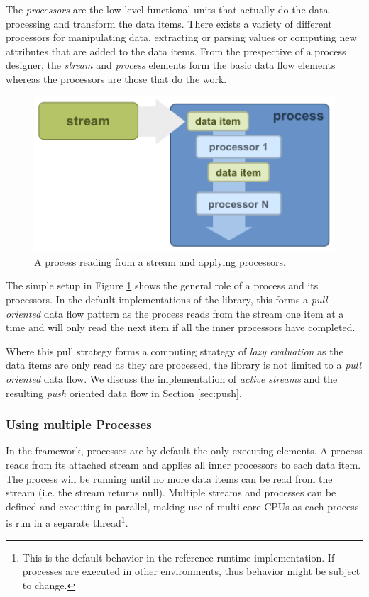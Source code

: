 The {\em processors} are the low-level functional units that actually
do the data processing and transform the data items. There exists a
variety of different processors for manipulating data, extracting or
parsing values or computing new attributes that are added to the data
items.  From the prespective of a process designer, the {\em stream}
and {\em process} elements form the basic data flow elements whereas
the processors are those that do the work.

\begin{figure}[h!]
  \begin{center}
    \includegraphics[scale=0.5]{graphics/inside-process.png}
  \end{center}
  \caption{\label{fig:process}A process reading from a stream and applying processors.}
\end{figure}

The simple setup in Figure \ref{fig:process} shows the general role of
a process and its processors. In the default implementations of the
\streams library, this forms a {\em pull oriented} data flow pattern
as the process reads from the stream one item at a time and will only
read the next item if all the inner processors have completed. 

Where this pull strategy forms a computing strategy of {\em lazy
  evaluation} as the data items are only read as they are processed,
the \streams library is not limited to a {\em pull oriented} data
flow. We discuss the implementation of {\em active streams} and the
resulting {\em push} oriented data flow in Section \ref{sec:push}.


\subsubsection*{Using multiple Processes}
In the \streams framework, processes are by default the only executing
elements. A process reads from its attached stream and applies all
inner processors to each data item. The process will be running until
no more data items can be read from the stream (i.e. the stream
returns {\ttfamily null}). Multiple streams and processes can be
defined and executing in parallel, making use of multi-core CPUs as
each process is run in a separate thread\footnote{This is the default
  behavior in the reference \streams runtime implementation. If
  \streams processes are executed in other environments, thus behavior
  might be subject to change.}.


